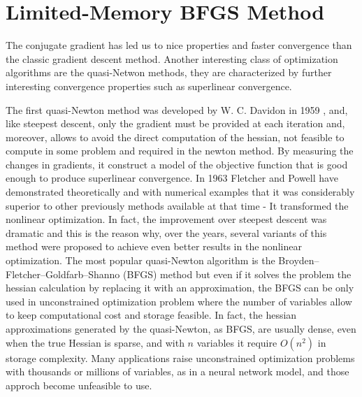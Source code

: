 \section{Limited-Memory BFGS Method}\label{sec:QNM}
The conjugate gradient has led us to nice properties and faster convergence than the classic gradient descent method. Another interesting class of optimization algorithms are the quasi-Netwon methods, they are characterized by further interesting convergence properties such as superlinear convergence.

The first quasi-Newton method was developed by W. C. Davidon in 1959 \cite{davidon}, and, like steepest descent, only the gradient must be provided at each iteration \cite{Nocedal} and, moreover, allows to avoid the direct computation of the hessian, not feasible to compute in some problem and required in the newton method. By measuring the changes in gradients, it construct a model of the objective function that is good enough to produce superlinear convergence. In 1963 Fletcher and Powell \cite{10.1093/comjnl/6.2.163} have demonstrated theoretically and with numerical examples that it was considerably superior to other previously methods available at that time - It transformed the nonlinear optimization. In fact, the improvement over steepest descent was dramatic and this is the reason why, over the years, several variants of this method were proposed to achieve even better results in the nonlinear optimization. The most popular quasi-Newton algorithm is the Broyden–Fletcher–Goldfarb–Shanno (BFGS) method but even if it solves the problem the hessian calculation by replacing it with an approximation, the BFGS can be only used in unconstrained optimization problem where the number of variables allow to keep computational cost and storage feasible. In fact, the hessian approximations generated by the quasi-Newton, as BFGS, are usually dense, even when the true Hessian is sparse, and with $n$ variables it require $O(n^2)$ in storage complexity. Many applications raise unconstrained optimization problems with thousands or millions of variables, as in a neural network model, and those approch become unfeasible to use.

